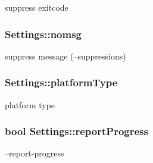 suppress exitcode 

\hypertarget{class_settings_aa34b7eef61a5ff9f98f1bfbbfca31a08}{
\subsubsection[{nomsg}]{ Settings\-::nomsg}}\label{class_settings_aa34b7eef61a5ff9f98f1bfbbfca31a08}


suppress message (--suppressions) 

\hypertarget{class_settings_a6c375855187695c207a7a873185c0d07}{
\subsubsection[{platform\-Type}]{ Settings\-::platform\-Type}}\label{class_settings_a6c375855187695c207a7a873185c0d07}
platform type \hypertarget{class_settings_a4b8992ce101fd7bb4e8cec8203b51a5b}{
\subsubsection[{report\-Progress}]{\setlength{\rightskip}{0pt plus 5cm}bool Settings\-::report\-Progress}}\label{class_settings_a4b8992ce101fd7bb4e8cec8203b51a5b}


--report-\/progress 

